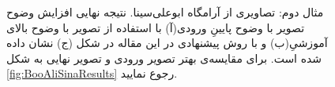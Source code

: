 \documentclass[11pt,a4paper,twocolumn]{article}
\numberwithin{table}{section}
\begin{document}
\begin{figure}[t]
\centering {}%
 \caption{مثال دوم: تصاویری از آرامگاه ابوعلی‌سینا. نتیجه نهایی افزایش وضوح تصویر با وضوح پایینِ ورودی(آ) با استفاده از تصویر با وضوح بالای آموزشیِ(ب) و با روش پیشنهادی در این مقاله در شکل (ج) نشان داده شده است. برای مقایسه‌ی بهتر تصویر ورودی و تصویر نهایی به شکل \ref{fig:BooAliSinaResults} رجوع نمایید.}
\label{fig:BooAliSina}
\end{figure}
\end{document}

